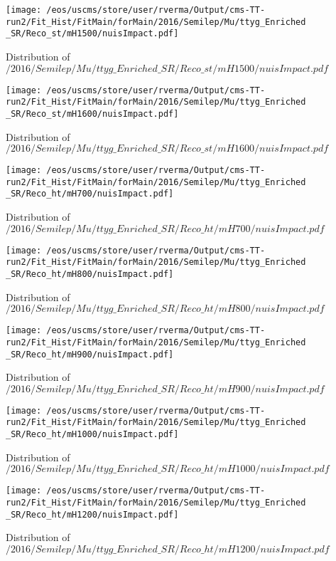 \begin{figure}
\centering
\texttt{[image: /eos/uscms/store/user/rverma/Output/cms-TT-run2/Fit\_Hist/FitMain/forMain/2016/Semilep/Mu/ttyg\_Enriched\_SR/Reco\_st/mH1500/nuisImpact.pdf]}
\caption{Distribution of $/2016/Semilep/Mu/ttyg\_Enriched\_SR/Reco\_st/mH1500/nuisImpact.pdf$}
\end{figure}

\begin{figure}
\centering
\texttt{[image: /eos/uscms/store/user/rverma/Output/cms-TT-run2/Fit\_Hist/FitMain/forMain/2016/Semilep/Mu/ttyg\_Enriched\_SR/Reco\_st/mH1600/nuisImpact.pdf]}
\caption{Distribution of $/2016/Semilep/Mu/ttyg\_Enriched\_SR/Reco\_st/mH1600/nuisImpact.pdf$}
\end{figure}

\begin{figure}
\centering
\texttt{[image: /eos/uscms/store/user/rverma/Output/cms-TT-run2/Fit\_Hist/FitMain/forMain/2016/Semilep/Mu/ttyg\_Enriched\_SR/Reco\_ht/mH700/nuisImpact.pdf]}
\caption{Distribution of $/2016/Semilep/Mu/ttyg\_Enriched\_SR/Reco\_ht/mH700/nuisImpact.pdf$}
\end{figure}

\begin{figure}
\centering
\texttt{[image: /eos/uscms/store/user/rverma/Output/cms-TT-run2/Fit\_Hist/FitMain/forMain/2016/Semilep/Mu/ttyg\_Enriched\_SR/Reco\_ht/mH800/nuisImpact.pdf]}
\caption{Distribution of $/2016/Semilep/Mu/ttyg\_Enriched\_SR/Reco\_ht/mH800/nuisImpact.pdf$}
\end{figure}

\begin{figure}
\centering
\texttt{[image: /eos/uscms/store/user/rverma/Output/cms-TT-run2/Fit\_Hist/FitMain/forMain/2016/Semilep/Mu/ttyg\_Enriched\_SR/Reco\_ht/mH900/nuisImpact.pdf]}
\caption{Distribution of $/2016/Semilep/Mu/ttyg\_Enriched\_SR/Reco\_ht/mH900/nuisImpact.pdf$}
\end{figure}

\begin{figure}
\centering
\texttt{[image: /eos/uscms/store/user/rverma/Output/cms-TT-run2/Fit\_Hist/FitMain/forMain/2016/Semilep/Mu/ttyg\_Enriched\_SR/Reco\_ht/mH1000/nuisImpact.pdf]}
\caption{Distribution of $/2016/Semilep/Mu/ttyg\_Enriched\_SR/Reco\_ht/mH1000/nuisImpact.pdf$}
\end{figure}

\begin{figure}
\centering
\texttt{[image: /eos/uscms/store/user/rverma/Output/cms-TT-run2/Fit\_Hist/FitMain/forMain/2016/Semilep/Mu/ttyg\_Enriched\_SR/Reco\_ht/mH1200/nuisImpact.pdf]}
\caption{Distribution of $/2016/Semilep/Mu/ttyg\_Enriched\_SR/Reco\_ht/mH1200/nuisImpact.pdf$}
\end{figure}

